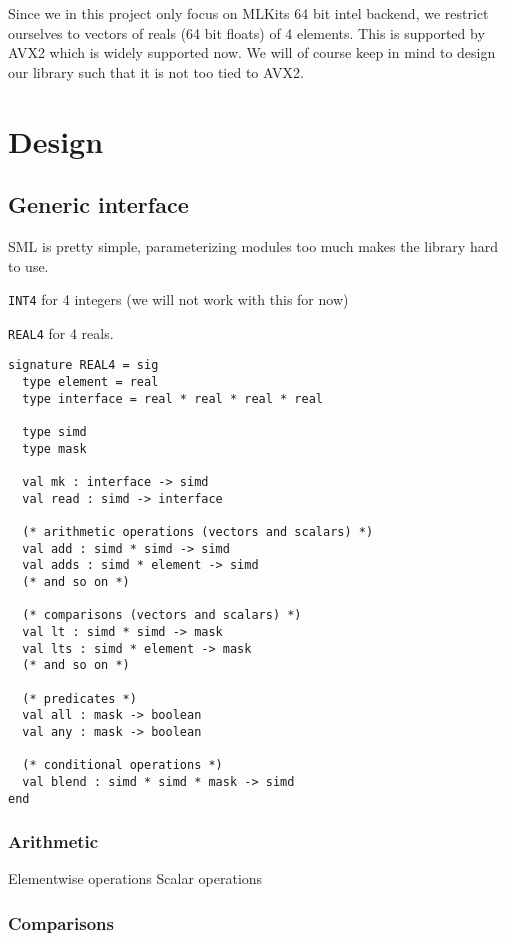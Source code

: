\documentclass{article}
\begin{document}
Since we in this project only focus on MLKits 64 bit intel backend, we restrict ourselves to vectors of reals (64 bit floats) of 4 elements. This is supported by AVX2 which is widely supported now. We will of course keep in mind to design our library such that it is not too tied to AVX2.

\section{Design}


\subsection{Generic interface}

SML is pretty simple, parameterizing modules too much makes the library hard to use.

\texttt{INT4} for 4 integers (we will not work with this for now)

\texttt{REAL4} for 4 reals.

\begin{lstlisting}[frame=single]
signature REAL4 = sig
  type element = real
  type interface = real * real * real * real

  type simd
  type mask

  val mk : interface -> simd
  val read : simd -> interface

  (* arithmetic operations (vectors and scalars) *)
  val add : simd * simd -> simd
  val adds : simd * element -> simd
  (* and so on *)

  (* comparisons (vectors and scalars) *)
  val lt : simd * simd -> mask
  val lts : simd * element -> mask
  (* and so on *)

  (* predicates *)
  val all : mask -> boolean
  val any : mask -> boolean

  (* conditional operations *)
  val blend : simd * simd * mask -> simd
end
\end{lstlisting}

\subsubsection{Arithmetic}

Elementwise operations
Scalar operations

\subsubsection{Comparisons}
\end{document}
